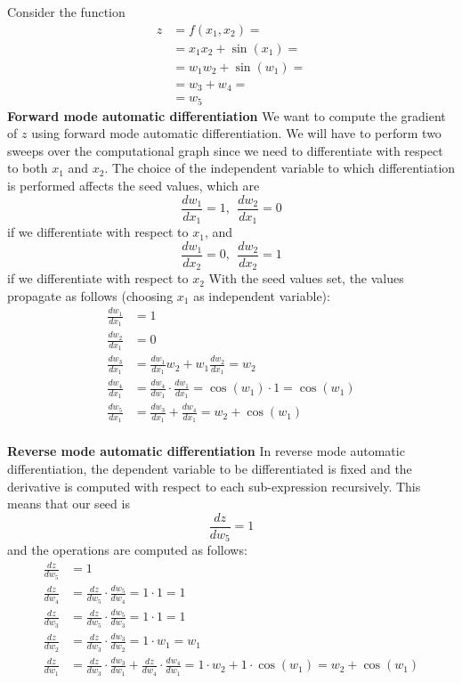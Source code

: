 \begin{example}
    Consider the function
    $$
        \begin{aligned}
            z &= f(x_1, x_2) =\\
            &= x_1x_2 + \sin{(x_1)} =\\
            &= w_1w_2 + \sin{(w_1)} =\\
            &= w_3 + w_4 =\\
            &= w_5
        \end{aligned}
    $$
    \textbf{Forward mode automatic differentiation} We want to compute the gradient of $z$ using forward mode automatic differentiation. We will have to perform two sweeps over the computational graph since we need to differentiate with respect to both $x_1$ and $x_2$. The choice of the independent variable to which differentiation is performed affects the seed values, which are
    $$ \frac{dw_1}{dx_1} = 1,\ \ \frac{dw_2}{dx_1} = 0 $$
    if we differentiate with respect to $x_1$, and
    $$ \frac{dw_1}{dx_2} = 0,\ \ \frac{dw_2}{dx_2} = 1 $$
    if we differentiate with respect to $x_2$
    With the seed values set, the values propagate as follows (choosing $x_1$ as independent variable):
    $$
        \begin{aligned}
            \frac{dw_1}{dx_1} &= 1\\
            \frac{dw_2}{dx_1} &= 0\\
            \frac{dw_3}{dx_1} &= \frac{dw_1}{dx_1}w_2 + w_1\frac{dw_2}{dx_1} = w_2\\
            \frac{dw_4}{dx_1} &= \frac{dw_4}{dw_1} \cdot \frac{dw_1}{dx_1} = \cos{(w_1)} \cdot 1 = \cos{(w_1)}\\
            \frac{dw_5}{dx_1} &= \frac{dw_3}{dx_1} + \frac{dw_4}{dx_1} = w_2 + \cos{(w_1)}\\
        \end{aligned}
    $$
\end{example}

\textbf{Reverse mode automatic differentiation} In reverse mode automatic differentiation, the dependent variable to be differentiated is fixed and the derivative is computed with respect to each sub-expression recursively. This means that our seed is
$$ \frac{dz}{dw_5} = 1 $$
and the operations are computed as follows:
$$
    \begin{aligned}
        \frac{dz}{dw_5} &= 1\\
        \frac{dz}{dw_4} &= \frac{dz}{dw_5} \cdot \frac{dw_5}{dw_4} = 1 \cdot 1 = 1\\
        \frac{dz}{dw_3} &= \frac{dz}{dw_5} \cdot \frac{dw_5}{dw_3} = 1 \cdot 1 = 1\\
        \frac{dz}{dw_2} &= \frac{dz}{dw_3} \cdot \frac{dw_3}{dw_2} = 1 \cdot w_1 = w_1\\
        \frac{dz}{dw_1} &= \frac{dz}{dw_3} \cdot \frac{dw_3}{dw_1} + \frac{dz}{dw_4} \cdot \frac{dw_4}{dw_1} = 1 \cdot w_2 + 1 \cdot \cos{(w_1)} = w_2 + \cos{(w_1)}\\
    \end{aligned}
$$